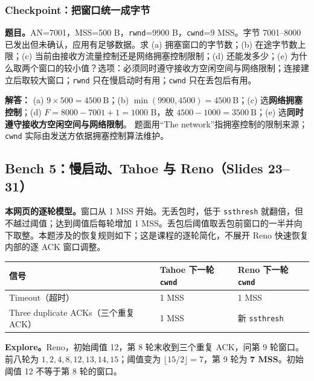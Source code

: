 \documentclass[11pt,a4paper,fontset=fandol]{ctexart}
\renewcommand{\exercisequestion}[2]{%
  \Needspace{5\baselineskip}%
  \subsubsection{#2}\label{exercise:#1}%
}
\renewenvironment{checkedsolution}
  {\par\nopagebreak[4]\textbf{解答：}\ignorespaces}
  {\par}
\begin{document}
\exercisequestion{SC2008-HW05-Q04}{Checkpoint：把窗口统一成字节}
\textbf{题目。}AN=7001，MSS=500 B，\texttt{rwnd}=9900 B，\texttt{cwnd}=9 MSS。字节 7001--8000 已发出但未确认，应用有足够数据。求 (a) 拥塞窗口的字节数；(b) 在途字节数上限；(c) 当前由接收方流量控制还是网络拥塞控制限制；(d) 还能发多少；(e) 为什么取两个窗口的较小值？选项：必须同时遵守接收方空闲空间与网络限制；连接建立后取较大窗口；\texttt{rwnd} 只在慢启动时有用；\texttt{cwnd} 只在丢包后有用。
\begin{checkedsolution}
(a) $9\times500=\boxed{4500\ \mathrm{B}}$；(b) $\min(9900,4500)=\boxed{4500\ \mathrm{B}}$；(c) 选\textbf{网络拥塞控制}；(d) $F=8000-7001+1=1000$ B，故 $4500-1000=\boxed{3500\ \mathrm{B}}$；(e) 选\textbf{同时遵守接收方空闲空间与网络限制}。
题面用“The network”指拥塞控制的限制来源；\texttt{cwnd} 实际由发送方依据拥塞控制算法维护。
\end{checkedsolution}

\subsection{Bench 5：慢启动、Tahoe 与 Reno（Slides 23--31）}

\textbf{本网页的逐轮模型。}窗口从 1 MSS 开始。无丢包时，低于 \texttt{ssthresh} 就翻倍，但不越过阈值；达到阈值后每轮增加 1 MSS。丢包后阈值取丢包前窗口的一半并向下取整。本题涉及的恢复规则如下；这是课程的逐轮简化，不展开 Reno 快速恢复内部的逐 ACK 窗口调整。
\begin{center}
\small
\begin{tabular}{@{}lll@{}}
\toprule
信号 & Tahoe 下一轮 \texttt{cwnd} & Reno 下一轮 \texttt{cwnd} \\
\midrule
Timeout（超时） & 1 MSS & 1 MSS \\
Three duplicate ACKs（三个重复 ACK） & 1 MSS & 新 \texttt{ssthresh} \\
\bottomrule
\end{tabular}
\end{center}
\textbf{Explore。}Reno，初始阈值 12，第 8 轮末收到三个重复 ACK，问第 9 轮窗口。
前八轮为 $1,2,4,8,12,13,14,15$；阈值变为 $\lfloor15/2\rfloor=7$，第 9 轮为 \textbf{7 MSS}。初始阈值 12 不等于第 8 轮的窗口。
\end{document}
